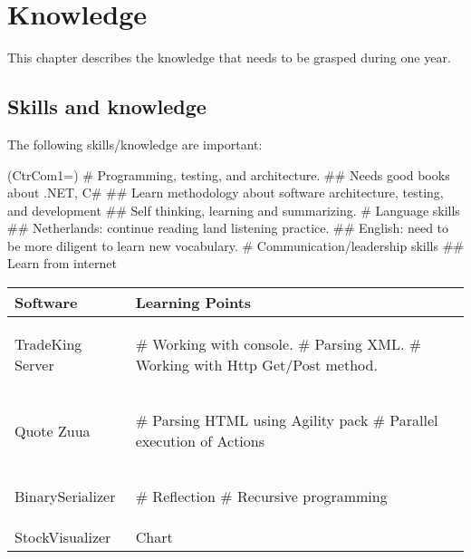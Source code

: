 \chapter{Knowledge}
\label{chap:intro}

This chapter describes the knowledge that needs to be grasped during one year. 

\section{Skills and knowledge}

The following skills/knowledge are important:
\begin{listb}
\ListProperties(CtrCom1=)
# Programming, testing, and architecture.
  ## Needs good books about .NET, C\#
  ## Learn methodology about software architecture, testing, and development
  ## Self thinking, learning and summarizing.  
# Language skills
  ## Netherlands: continue reading land listening practice.
  ## English: need to be more diligent to learn new vocabulary.
# Communication/leadership skills
  ## Learn from internet
\end{listb}

\begin{table}
\begin{tabular}{p{4cm}|p{7cm}}
Software & Learning Points \\ \hline
TradeKing Server & 
\begin{listb}
# Working with console.
# Parsing XML.
# Working with Http Get/Post method.
\end{listb} \\ \hline
Quote Zuua &
\begin{listb}
# Parsing HTML using Agility pack
# Parallel execution of Actions
\end{listb} \\ \hline
BinarySerializer &
\begin{listb}
# Reflection
# Recursive programming
\end{listb} \\ \hline
StockVisualizer & \hspace{1cm}Chart \\ \hline

\end{tabular}
\end{table}